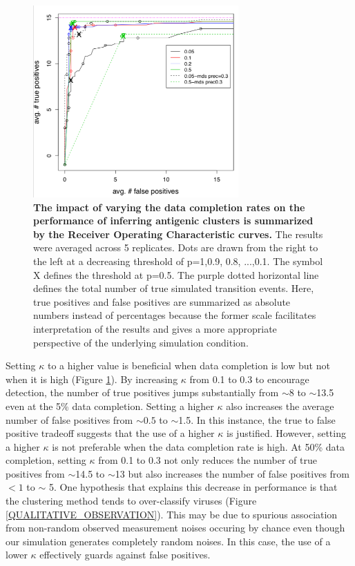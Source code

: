 \documentclass[11pt,oneside,letterpaper]{article}
\begin{document}
\begin{figure}[h]
	\centering		
	\includegraphics[width=0.7\textwidth]{figures/custom/ROC-simulation}
	\caption{\textbf{The impact of varying the data completion rates on the performance of inferring antigenic clusters is summarized by the Receiver Operating Characteristic curves.} 
 The results were averaged across 5 replicates.	
 Dots are drawn from the right to the left at a decreasing threshold of p=1,0.9, 0.8, ...,0.1. 
 The symbol X defines the threshold at p=0.5. 
The purple dotted horizontal line defines the total number of true simulated transition events. 
Here, true positives and false positives are summarized as absolute numbers instead of percentages because the former scale facilitates interpretation of the results and gives a more appropriate perspective of the underlying simulation condition.
	 		} 
	
	\label{ROCSimulation} 
\end{figure}






Setting $\kappa$ to a higher value is beneficial when data completion is low but not when it is high (Figure \ref{ROCSimulation}). 
By increasing $\kappa$ from 0.1 to 0.3 to encourage detection, the number of true positives jumps substantially from $\sim8$ to $\sim$13.5 even at the 5\% data completion. 
Setting a higher $\kappa$ also increases the average number of false positives from $\sim0.5$ to $\sim$1.5. 
In this instance, the true to false positive tradeoff suggests that the use of a higher $\kappa$ is justified. 
However, setting a higher $\kappa$ is not preferable when the data completion rate is high. 
At 50\% data completion, setting $\kappa$ from 0.1 to 0.3 not only reduces the number of true positives from $\sim$14.5 to $\sim$13 but also increases the number of false positives from $<1$ to $\sim$ 5. 
One hypothesis that explains this decrease in performance is that the clustering method tends to over-classify viruses (Figure \ref{QUALITATIVE_OBSERVATION}).
This may be due to  spurious association from non-random observed measurement noises occuring by chance even though our simulation generates completely random noises. 
In this case, the use of a lower $\kappa$ effectively guards against false positives.
\end{document}
